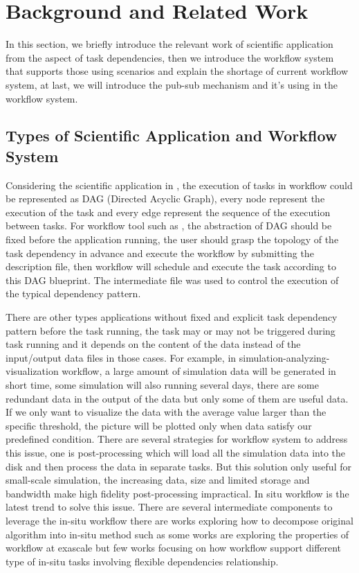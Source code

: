\section{Background and Related Work}
In this section, we briefly introduce the relevant work of scientific application from the aspect of task dependencies, then we introduce the workflow system that supports those using scenarios and explain the shortage of current workflow system, at last, we will introduce the pub-sub mechanism and it's using in the workflow system.

\subsection{Types of Scientific Application and Workflow System}
Considering the scientific application in \cite{makeflowexample}, the execution of tasks in workflow could be represented as DAG (Directed Acyclic Graph), every node represent the execution of the task and every edge represent the sequence of the execution between tasks. For workflow tool such as \cite{makeflowexample,wilde2011swift}, the abstraction of DAG should be fixed before the application running, the user should grasp the topology of the task dependency in advance and execute the workflow by submitting the description file, then workflow will schedule and execute the task according to this DAG blueprint. The intermediate file was used to control the execution of the typical dependency pattern\cite{bharathi2008characterization}.

There are other types applications without fixed and explicit task dependency pattern before the task running, the task may or may not be triggered during task running and it depends on the content of the data instead of the input/output data files in those cases. For example, in simulation-analyzing-visualization workflow, a large amount of simulation data will be generated in short time, some simulation will also running several days, there are some redundant data in the output of the data but only some of them are useful data. If we only want to visualize the data with the average value larger than the specific threshold, the picture will be plotted only when data satisfy our predefined condition. There are several strategies for workflow system to address this issue, one is post-processing which will load all the simulation data into the disk and then process the data in separate tasks. But this solution only useful for small-scale simulation, the increasing data, size and limited storage and bandwidth make high fidelity post-processing impractical\cite{ayachit2015paraview}. In situ workflow is the latest trend to solve this issue\cite{dreher2017situ}. There are several intermediate components to leverage the in-situ workflow\cite{docan2012dataspaces,ayachit2015paraview}  there are works exploring how to decompose original algorithm into in-situ method such as\cite{bennett2012combining} some works are exploring the properties of workflow at exascale\cite{dreher2017situ} but few works focusing on how workflow support different type of in-situ tasks involving flexible dependencies relationship. 

